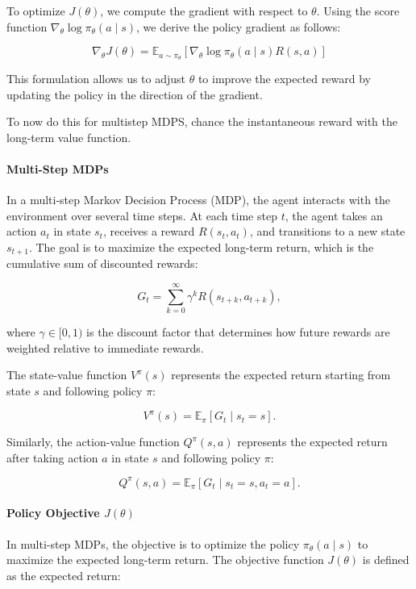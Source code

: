 \documentclass[10pt, oneside]{article}
\theoremstyle{definition}
\begin{document}
To optimize \( J(\theta) \), we compute the gradient with respect to \( \theta \). Using the score function \( \nabla_\theta \log \pi_\theta(a \mid s) \), we derive the policy gradient as follows:

\[
\nabla_\theta J(\theta) = \mathbb{E}_{a \sim \pi_\theta} \left[ \nabla_\theta \log \pi_\theta(a \mid s) R(s, a) \right]
\]

This formulation allows us to adjust \( \theta \) to improve the expected reward by updating the policy in the direction of the gradient.

To now do this for multistep MDPS, chance the instantaneous reward with the long-term value function. 

\paragraph{Multi-Step MDPs}

In a multi-step Markov Decision Process (MDP), the agent interacts with the environment over several time steps. At each time step \( t \), the agent takes an action \( a_t \) in state \( s_t \), receives a reward \( R(s_t, a_t) \), and transitions to a new state \( s_{t+1} \). The goal is to maximize the expected long-term return, which is the cumulative sum of discounted rewards:

\[
G_t = \sum_{k=0}^{\infty} \gamma^k R(s_{t+k}, a_{t+k}),
\]

where \( \gamma \in [0,1) \) is the discount factor that determines how future rewards are weighted relative to immediate rewards.

The state-value function \( V^\pi(s) \) represents the expected return starting from state \( s \) and following policy \( \pi \):

\[
V^\pi(s) = \mathbb{E}_\pi [ G_t \mid s_t = s ].
\]

Similarly, the action-value function \( Q^\pi(s, a) \) represents the expected return after taking action \( a \) in state \( s \) and following policy \( \pi \):

\[
Q^\pi(s, a) = \mathbb{E}_\pi [ G_t \mid s_t = s, a_t = a ].
\]

\paragraph{Policy Objective \( J(\theta) \)}

In multi-step MDPs, the objective is to optimize the policy \( \pi_\theta(a \mid s) \) to maximize the expected long-term return. The objective function \( J(\theta) \) is defined as the expected return:
\end{document}
